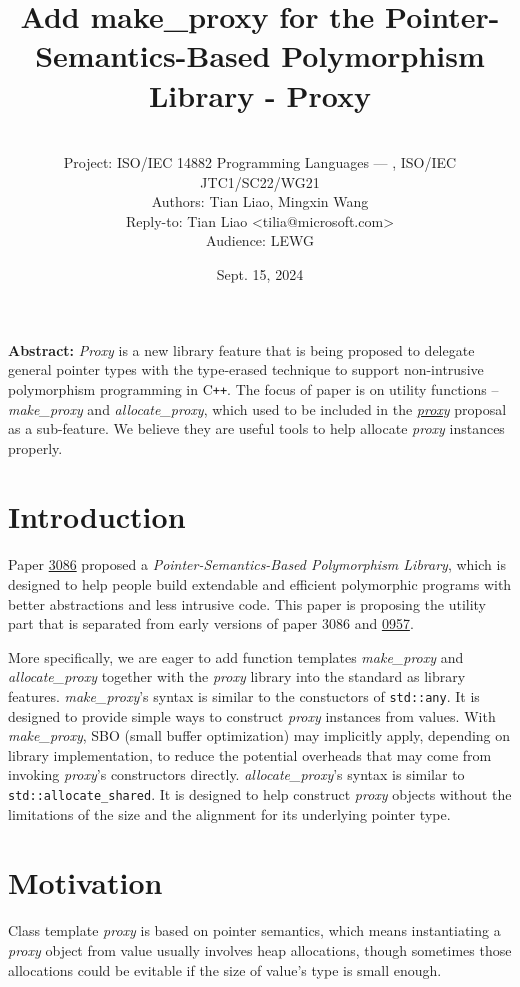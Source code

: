 \documentclass[10pt, a4paper, oneside]{article}
\title{Add make\_proxy for the Pointer-Semantics-Based
Polymorphism Library - Proxy}
\date{Sept. 15, 2024}
\author{%
\ \\
Project: ISO/IEC 14882 Programming Languages — \Cpp, ISO/IEC JTC1/SC22/WG21\\
Authors: Tian Liao, Mingxin Wang\\
Reply-to: Tian Liao \textless tilia@microsoft.com\textgreater \\
Audience: LEWG\\
}
\makeatletter
\newcommand{\Cpp}{C\texttt{++}}
\renewcommand{\maketitle}{\bgroup\setlength{\parindent}{0pt}
\begin{flushleft}
  \textbf{\huge \@title}

  \@author
\end{flushleft}\egroup
}
\makeatother
\begin{document}
\maketitle

\textbf{Abstract:} \textit{Proxy} is a new library feature that is being proposed to delegate general pointer types
with the type-erased technique to support non-intrusive polymorphism programming in \Cpp.
The focus of paper is on utility functions -- \textit{make\_proxy} and \textit{allocate\_proxy},
which used to be included in the \href{https://wg21.link/p3086r1}{\textit{proxy}} proposal as a sub-feature.
We believe they are useful tools to help allocate \textit{proxy} instances properly.

\section{Introduction}

Paper \href{https://wg21.link/p3086}{3086} proposed a \textit{Pointer-Semantics-Based Polymorphism Library},
which is designed to help people build extendable and efficient polymorphic programs with better abstractions and less intrusive code.
This paper is proposing the utility part that is separated from early versions of paper 3086 and \href{https://wg21.link/p0957}{0957}.

More specifically, we are eager to add function templates \textit{make\_proxy} and \textit{allocate\_proxy} together with the \textit{proxy} library into the standard as library features.
\textit{make\_proxy}'s syntax is similar to the constuctors of \verb|std::any|. It is designed to provide simple ways to construct \textit{proxy} instances from values.
With \textit{make\_proxy}, SBO (small buffer optimization) may implicitly apply, depending on library implementation, to reduce the potential overheads that may come from invoking \textit{proxy}'s constructors directly.
\textit{allocate\_proxy}'s syntax is similar to \verb|std::allocate_shared|. It is designed to help construct \textit{proxy} objects without the limitations of the size and the alignment for its underlying pointer type.

\section{Motivation}
Class template \textit{proxy} is based on pointer semantics,
which means instantiating a \textit{proxy} object from value usually involves heap allocations,
though sometimes those allocations could be evitable if the size of value's type is small enough.
\end{document}
